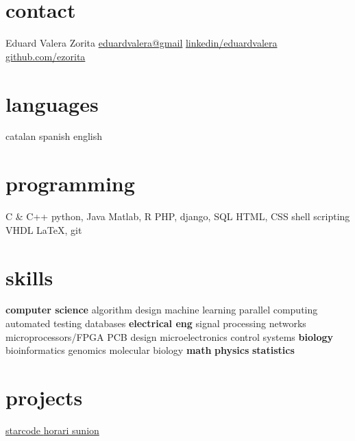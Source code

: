 \documentclass[]{friggeri-cv} %
\begin{document}



\begin{aside} %
  \section{contact}
  {\FA \faUser}
  Eduard Valera Zorita
  {\FA \faEnvelope}
  \href{mailto:eduardvalera@gmail.com}{eduardvalera@gmail}
  {\FA \faLinkedinSign}
  \href{http://www.linkedin.com/in/eduardvalera}{linkedin/eduardvalera}
  {\FA \faGithubSign}
  \href{http://github.com/ezorita}{github.com/ezorita}
  \section{languages}
  catalan
  spanish
  english
  \section{programming}
  C \& C++
  python, Java
  Matlab, R
  PHP, django, SQL
  HTML, CSS
  shell scripting
  VHDL
  \LaTeX, git
  \section{skills}
  {\bf computer science}
  algorithm design
  machine learning
  parallel computing
  automated testing
  databases
  {\bf electrical eng}
  signal processing
  networks
  microprocessors/FPGA
  PCB design
  microelectronics
  control systems
  {\bf biology}
  bioinformatics
  genomics
  molecular biology
  {\bf math}
  {\bf physics}
  {\bf statistics}
  \section{projects}
  \href{http://github.com/gui11aume/starcode}{starcode {\FA \faExternalLink}}
  \href{http://horari.sunion.cat}{horari sunion {\FA \faExternalLink}}
\end{aside}

\end{document}
